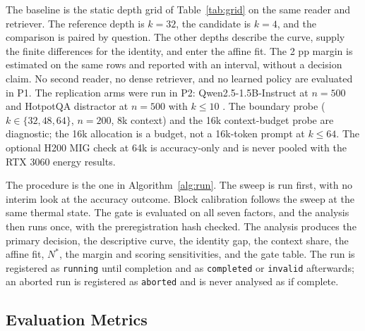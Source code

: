 \documentclass[a4paper,fleqn]{cas-sc}
\begin{document}
The baseline is the static depth grid of Table~\ref{tab:grid} on the same reader and retriever. The reference depth is $k=32$, the candidate is $k=4$, and the comparison is paired by question. The other depths describe the curve, supply the finite differences for the identity, and enter the affine fit. The 2 pp margin is estimated on the same rows and reported with an interval, without a decision claim. No second reader, no dense retriever, and no learned policy are evaluated in P1. The replication arms were run in P2: Qwen2.5-1.5B-Instruct at $n=500$ and HotpotQA distractor at $n=500$ with $k\le10$ \cite{qwen25,yang2018hotpotqa}. The boundary probe ($k\in\{32,48,64\}$, $n=200$, 8k context) and the 16k context-budget probe are diagnostic; the 16k allocation is a budget, not a 16k-token prompt at $k\le64$. The optional H200 MIG check at 64k is accuracy-only and is never pooled with the RTX 3060 energy results.

The procedure is the one in Algorithm~\ref{alg:run}. The sweep is run first, with no interim look at the accuracy outcome. Block calibration follows the sweep at the same thermal state. The gate is evaluated on all seven factors, and the analysis then runs once, with the preregistration hash checked. The analysis produces the primary decision, the descriptive curve, the identity gap, the context share, the affine fit, $N^{*}$, the margin and scoring sensitivities, and the gate table. The run is registered as \texttt{running} until completion and as \texttt{completed} or \texttt{invalid} afterwards; an aborted run is registered as \texttt{aborted} and is never analysed as if complete.

\subsection{Evaluation Metrics}\label{sec:metrics}
\end{document}
